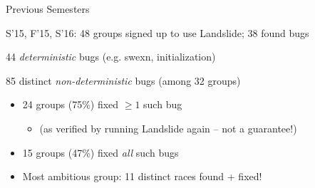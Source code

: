 \documentclass[xcolor=dvipsnames]{beamer}
\begin{document}
\begin{frame}{Previous Semesters}

	S'15, F'15, S'16: 48 groups signed up to use Landslide; 38 found bugs
	\linegap

	44 {\em deterministic} bugs (e.g. swexn, initialization)
	\linegap

	85 distinct {\em non-deterministic} bugs (among 32 groups)
	\begin{itemize}
		\item 24 groups (75\%) fixed $\ge 1$ such bug
			\begin{itemize}
				\item (as verified by running Landslide again -- not a guarantee!)
			\end{itemize}
		\item 15 groups (47\%) fixed {\em all} such bugs
		\item Most ambitious group: 11 distinct races found + fixed!
	\end{itemize}
	\linegap


\end{frame}
\end{document}
